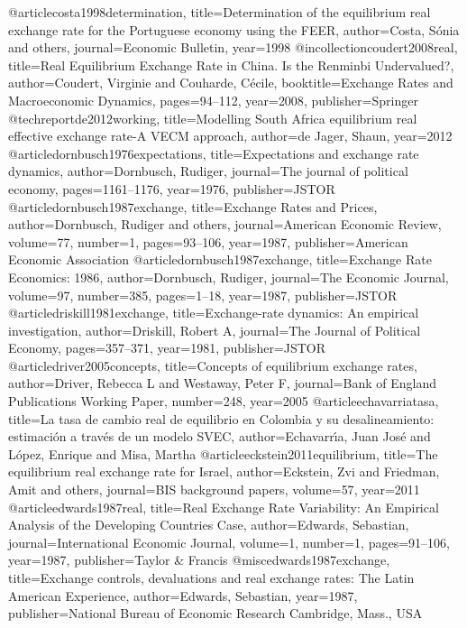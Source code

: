 @article{costa1998determination,
  title={Determination of the equilibrium real exchange rate for the Portuguese economy using the FEER},
  author={Costa, S{\'o}nia and others},
  journal={Economic Bulletin},
  year={1998}
}
@incollection{coudert2008real,
  title={Real Equilibrium Exchange Rate in China. Is the Renminbi Undervalued?},
  author={Coudert, Virginie and Couharde, C{\'e}cile},
  booktitle={Exchange Rates and Macroeconomic Dynamics},
  pages={94--112},
  year={2008},
  publisher={Springer}
}
@techreport{de2012working,
  title={Modelling South Africa equilibrium real effective exchange rate-A VECM approach},
  author={de Jager, Shaun},
  year={2012}
}
@article{dornbusch1976expectations,
  title={Expectations and exchange rate dynamics},
  author={Dornbusch, Rudiger},
  journal={The journal of political economy},
  pages={1161--1176},
  year={1976},
  publisher={JSTOR}
}
@article{dornbusch1987exchange,
  title={Exchange Rates and Prices},
  author={Dornbusch, Rudiger and others},
  journal={American Economic Review},
  volume={77},
  number={1},
  pages={93--106},
  year={1987},
  publisher={American Economic Association}
}
@article{dornbusch1987exchange,
  title={Exchange Rate Economics: 1986},
  author={Dornbusch, Rudiger},
  journal={The Economic Journal},
  volume={97},
  number={385},
  pages={1--18},
  year={1987},
  publisher={JSTOR}
}
@article{driskill1981exchange,
  title={Exchange-rate dynamics: An empirical investigation},
  author={Driskill, Robert A},
  journal={The Journal of Political Economy},
  pages={357--371},
  year={1981},
  publisher={JSTOR}
}
@article{driver2005concepts,
  title={Concepts of equilibrium exchange rates},
  author={Driver, Rebecca L and Westaway, Peter F},
  journal={Bank of England Publications Working Paper},
  number={248},
  year={2005}
}
@article{echavarriatasa,
  title={La tasa de cambio real de equilibrio en Colombia y su desalineamiento: estimaci{\'o}n a trav{\'e}s de un modelo SVEC},
  author={Echavarr{\'\i}a, Juan Jos{\'e} and L{\'o}pez, Enrique and Misa, Martha}
}
@article{eckstein2011equilibrium,
  title={The equilibrium real exchange rate for Israel},
  author={Eckstein, Zvi and Friedman, Amit and others},
  journal={BIS background papers},
  volume={57},
  year={2011}
}
@article{edwards1987real,
  title={Real Exchange Rate Variability: An Empirical Analysis of the Developing Countries Case},
  author={Edwards, Sebastian},
  journal={International Economic Journal},
  volume={1},
  number={1},
  pages={91--106},
  year={1987},
  publisher={Taylor \& Francis}
}
@misc{edwards1987exchange,
  title={Exchange controls, devaluations and real exchange rates: The Latin American Experience},
  author={Edwards, Sebastian},
  year={1987},
  publisher={National Bureau of Economic Research Cambridge, Mass., USA}
}
